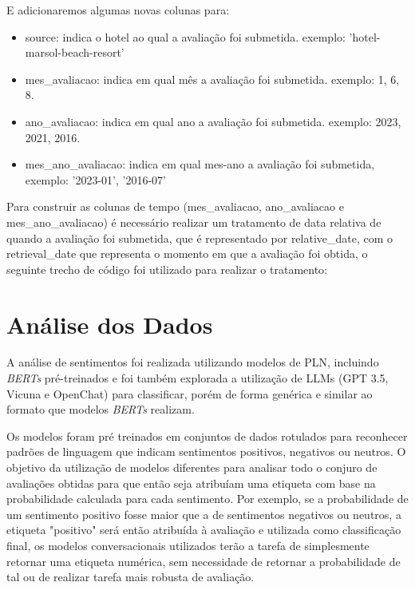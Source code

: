E adicionaremos algumas novas colunas para:

\begin{itemize}
	\item source: indica o hotel ao qual a avaliação foi submetida. exemplo: 'hotel-marsol-beach-resort'
	\item mes\_avaliacao: indica em qual mês a avaliação foi submetida. exemplo: 1, 6, 8.
	\item ano\_avaliacao: indica em qual ano a avaliação foi submetida. exemplo: 2023, 2021, 2016.
	\item mes\_ano\_avaliacao: indica em qual mes-ano a avaliação foi submetida, exemplo: '2023-01', '2016-07'
\end{itemize}

Para construir as colunas de tempo (mes\_avaliacao, ano\_avaliacao e mes\_ano\_avaliacao) é necessário realizar um tratamento de data relativa de quando a avaliação foi submetida, que é representado por relative\_date, com o retrieval\_date que representa o momento em que a avaliação foi obtida, o seguinte trecho de código foi utilizado para realizar o tratamento:



\section{Análise dos Dados}
\label{cap:metodologia:sec:analise_dados}

A análise de sentimentos foi realizada utilizando modelos de PLN, incluindo \textit{BERTs} pré-treinados e foi também explorada a utilização de LLMs (GPT 3.5, Vicuna e OpenChat) para classificar, porém de forma genérica e similar ao formato que modelos \textit{BERTs} realizam.

Os modelos foram pré treinados em conjuntos de dados rotulados para reconhecer padrões de linguagem que indicam sentimentos positivos, negativos ou neutros. O objetivo da utilização de modelos diferentes para analisar todo o conjuro de avaliações obtidas para que então seja atribuíam uma etiqueta com base na probabilidade calculada para cada sentimento. Por exemplo, se a probabilidade de um sentimento positivo fosse maior que a de sentimentos negativos ou neutros, a etiqueta "positivo" será então atribuída à avaliação e utilizada como classificação final, os modelos conversacionais utilizados terão a tarefa de simplesmente retornar uma etiqueta numérica, sem necessidade de retornar a probabilidade de tal ou de realizar tarefa mais robusta de avaliação.

